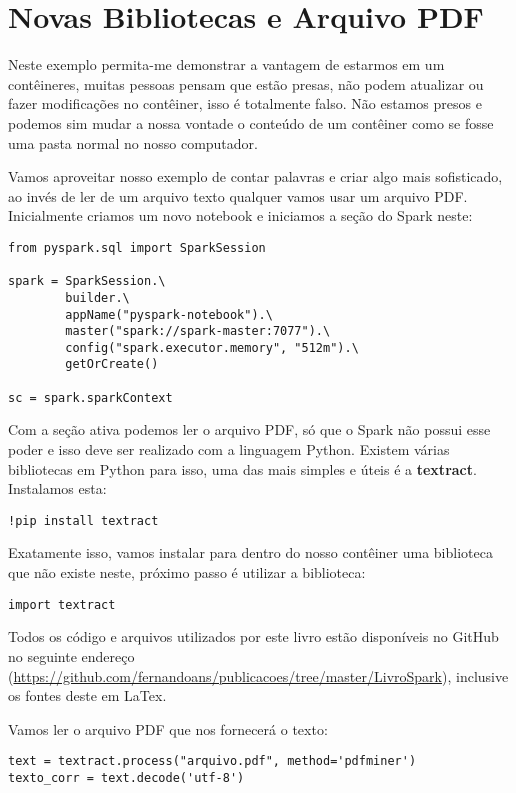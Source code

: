 \section{Novas Bibliotecas e Arquivo PDF}
Neste exemplo permita-me demonstrar a vantagem de estarmos em um contêineres, muitas pessoas pensam que estão presas, não podem atualizar ou fazer modificações no contêiner, isso é totalmente falso. Não estamos presos e podemos sim mudar a nossa vontade o conteúdo de um contêiner como se fosse uma pasta normal no nosso computador.

Vamos aproveitar nosso exemplo de contar palavras e criar algo mais sofisticado, ao invés de ler de um arquivo texto qualquer vamos usar um arquivo PDF. Inicialmente criamos um novo notebook e iniciamos a seção do Spark neste:
\begin{lstlisting}[]
from pyspark.sql import SparkSession

spark = SparkSession.\
        builder.\
        appName("pyspark-notebook").\
        master("spark://spark-master:7077").\
        config("spark.executor.memory", "512m").\
        getOrCreate()
        
sc = spark.sparkContext        
\end{lstlisting}

Com a seção ativa podemos ler o arquivo PDF, só que o Spark não possui esse poder e isso deve ser realizado com a linguagem Python. Existem várias bibliotecas em Python para isso, uma das mais simples e úteis é a \textbf{textract}. Instalamos esta:
\begin{lstlisting}[]
!pip install textract
\end{lstlisting}

Exatamente isso, vamos instalar para dentro do nosso contêiner uma biblioteca que não existe neste, próximo passo é utilizar a biblioteca:
\begin{lstlisting}[]
import textract
\end{lstlisting}

\begin{note}[Onde está o PDF?] 
	Todos os código e arquivos utilizados por este livro estão disponíveis no GitHub no seguinte endereço (\url{https://github.com/fernandoans/publicacoes/tree/master/LivroSpark}), inclusive os fontes deste em LaTex.
\end{note}

Vamos ler o arquivo PDF que nos fornecerá o texto:
\begin{lstlisting}[]
text = textract.process("arquivo.pdf", method='pdfminer')
texto_corr = text.decode('utf-8')
\end{lstlisting}

